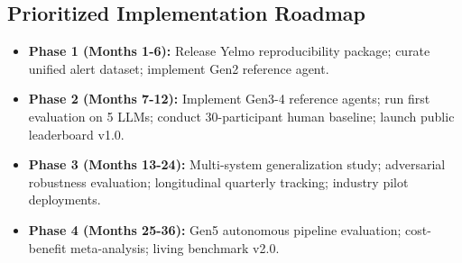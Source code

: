 \documentclass[journal]{IEEEtran}
\begin{document}
\subsection{Prioritized Implementation Roadmap}
\begin{itemize}
    \item \textbf{Phase 1 (Months 1-6):} Release Yelmo reproducibility package; curate unified alert dataset; implement Gen2 reference agent.
    \item \textbf{Phase 2 (Months 7-12):} Implement Gen3-4 reference agents; run first evaluation on 5 LLMs; conduct 30-participant human baseline; launch public leaderboard v1.0.
    \item \textbf{Phase 3 (Months 13-24):} Multi-system generalization study; adversarial robustness evaluation; longitudinal quarterly tracking; industry pilot deployments.
    \item \textbf{Phase 4 (Months 25-36):} Gen5 autonomous pipeline evaluation; cost-benefit meta-analysis; living benchmark v2.0.
\end{itemize}
\end{document}
